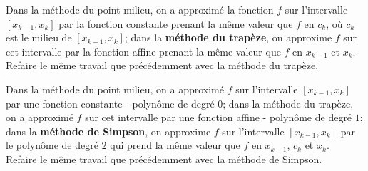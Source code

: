 \documentclass{exam}
\begin{document}
\begin{questions}

\question
Dans la méthode du point milieu, on a approximé la fonction $f$ sur l'intervalle $[x_{k-1}, x_k]$ par la fonction constante prenant la même valeur que $f$ en $c_k$, où $c_k$ est le milieu de $[x_{k-1}, x_k]$; dans la {\bf méthode du trapèze}, on approxime $f$ sur cet intervalle par la fonction affine prenant la même valeur que $f$ en $x_{k-1}$ et $x_k$.\\
Refaire le même travail que précédemment avec la méthode du trapèze.


\question
Dans la méthode du point milieu, on a approximé $f$ sur l'intervalle $[x_{k-1}, x_k]$ par une fonction constante - polynôme de degré $0$; dans la méthode du trapèze, on a approximé $f$ sur cet intervalle par une fonction affine - polynôme de degré $1$; dans la {\bf méthode de Simpson}, on approxime $f$ sur l'intervalle $[x_{k-1}, x_k]$ par le polynôme de degré $2$ qui prend la même valeur que $f$ en $x_{k-1}$, $c_k$ et $x_k$.\\
Refaire le même travail que précédemment avec la méthode de Simpson.


\end{questions}
\end{document}
